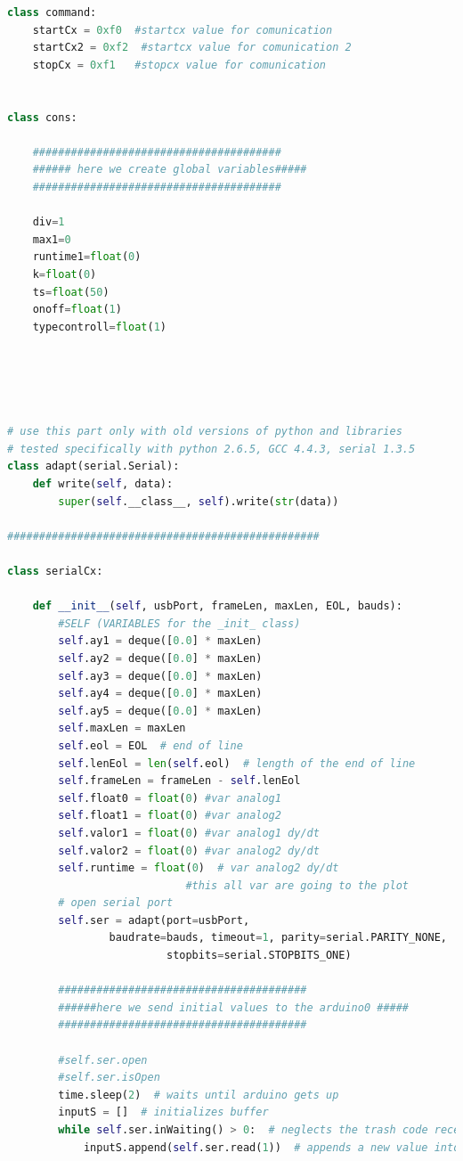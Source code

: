 {\begin{lstlisting}[language=python]
class command:
    startCx = 0xf0  #startcx value for comunication
    startCx2 = 0xf2  #startcx value for comunication 2
    stopCx = 0xf1   #stopcx value for comunication


class cons:

    #######################################
    ###### here we create global variables#####
    #######################################

    div=1
    max1=0
    runtime1=float(0)
    k=float(0)
    ts=float(50)
    onoff=float(1)
    typecontroll=float(1)





# use this part only with old versions of python and libraries
# tested specifically with python 2.6.5, GCC 4.4.3, serial 1.3.5
class adapt(serial.Serial):
    def write(self, data):
        super(self.__class__, self).write(str(data))

#################################################

class serialCx:

    def __init__(self, usbPort, frameLen, maxLen, EOL, bauds):
        #SELF (VARIABLES for the _init_ class)
        self.ay1 = deque([0.0] * maxLen)
        self.ay2 = deque([0.0] * maxLen)
        self.ay3 = deque([0.0] * maxLen)
        self.ay4 = deque([0.0] * maxLen)
        self.ay5 = deque([0.0] * maxLen)
        self.maxLen = maxLen
        self.eol = EOL  # end of line
        self.lenEol = len(self.eol)  # length of the end of line
        self.frameLen = frameLen - self.lenEol
        self.float0 = float(0) #var analog1
        self.float1 = float(0) #var analog2
        self.valor1 = float(0) #var analog1 dy/dt
        self.valor2 = float(0) #var analog2 dy/dt
        self.runtime = float(0)  # var analog2 dy/dt
                            #this all var are going to the plot
        # open serial port
        self.ser = adapt(port=usbPort,
				baudrate=bauds, timeout=1, parity=serial.PARITY_NONE,
                         stopbits=serial.STOPBITS_ONE)

        #######################################
        ######here we send initial values to the arduino0 #####
        #######################################

        #self.ser.open
        #self.ser.isOpen
        time.sleep(2)  # waits until arduino gets up
        inputS = []  # initializes buffer
        while self.ser.inWaiting() > 0:  # neglects the trash code received
            inputS.append(self.ser.read(1))  # appends a new value into the buffer


\end{lstlisting}}

